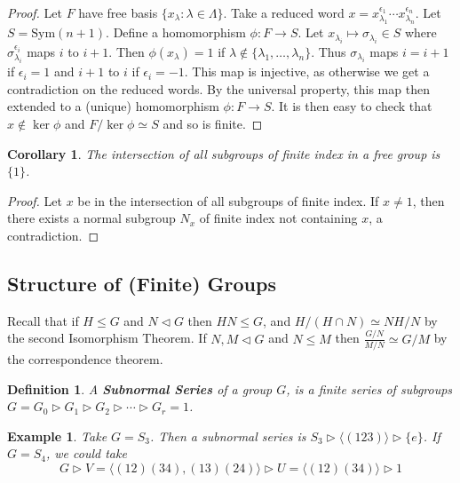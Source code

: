 \documentclass[a4paper,10pt]{article}
\newtheorem{Def}[thm]{Definition}
\newtheorem{Cor}[thm]{Corollary}
\newtheorem{eg}[thm]{Example}
\begin{document}
\begin{proof}
Let $F$ have free basis $\{ x_\lambda : \lambda \in \Lambda \}$. Take a reduced word $x = x_{\lambda_1}^{\epsilon_1} \cdots x_{\lambda_n}^{\epsilon_n}$. Let $S = \text{Sym}(n+1)$. Define a homomorphism $\phi : F \rightarrow S$. Let $x_{\lambda_i} \mapsto \sigma_{\lambda_i} \in S$ where $\sigma_{\lambda_i}^{\epsilon_i}$ maps $i$ to $i+1$. Then $\phi(x_\lambda) = 1$ if $\lambda \notin \{\lambda_1, \dots, \lambda_n \}$. Thus $\sigma_{\lambda_i}$ maps $i = i+1$ if $\epsilon_i =1$ and $i+1$ to $i$ if $\epsilon_i = -1$. This map is injective, as otherwise we get a contradiction on the reduced words. By the universal property, this map then extended to a (unique) homomorphism $\phi : F \rightarrow S$. It is then easy to check that $x \notin \ker \phi$ and $F / \ker \phi \simeq S$ and so is finite.
\end{proof}

\begin{Cor}
The intersection of all subgroups of finite index in a free group is $\{1\}$.
\end{Cor}

\begin{proof}
Let $x$ be in the intersection of all subgroups of finite index. If $x \neq 1$, then there exists a normal subgroup $N_x$ of finite index not containing $x$, a contradiction.
\end{proof}


\subsection{Structure of (Finite) Groups}

Recall that if $H \leq G$ and $N \triangleleft G$ then $HN \leq G$, and $H / (H \cap N) \simeq NH / N$ by the second Isomorphism Theorem. If $N,M \triangleleft G$ and $N \leq M$ then $\frac{G / N}{M / N} \simeq G / M$ by the correspondence theorem.  

\begin{Def}
A \textbf{Subnormal Series} of a group $G$, is a finite series of subgroups $G = G_0 \triangleright G_1 \triangleright G_2 \triangleright \cdots \triangleright G_r = 1$.
\end{Def}

\begin{eg}
Take $G = S_3$. Then a subnormal series is $S_3 \triangleright \langle (123) \rangle \triangleright \{e\}$. If $G = S_4$, we could take
\[ G \triangleright V = \langle (12)(34), (13)(24) \rangle \triangleright U = \langle (12)(34) \rangle \triangleright 1 \] 
\end{eg}
\end{document}
